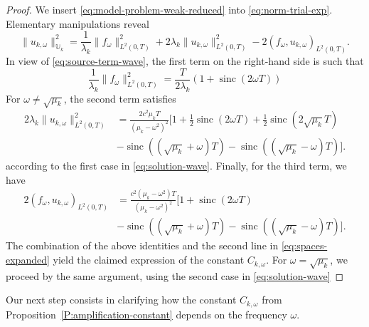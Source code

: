 \documentclass{amsart}
\theoremstyle{plain}
\theoremstyle{remark}
\numberwithin{equation}{section}
\numberwithin{theorem}{section}
\newcommand{\trial}{\mathbb{U}}
\newcommand{\sinc}{\operatorname{sinc}}
\begin{document}
\begin{proof}
We insert \eqref{eq:model-problem-weak-reduced} into \eqref{eq:norm-trial-exp}. Elementary manipulations reveal
\begin{equation*}
\|u_{k,\omega}\|^2_{\trial_k} 
=
\frac{1}{\lambda_k} \|f_\omega\|^2_{L^2(0,T)} + 2\lambda_k \|u_{k,\omega}\|^2_{L^2(0,T)} - 2 (f_\omega, u_{k,\omega})_{L^2(0,T)}. 
\end{equation*}
In view of \eqref{eq:source-term-wave}, the first term on the right-hand side is such that
\begin{equation*}
	\frac{1}{\lambda_k}\|f_\omega\|^2_{L^2(0,T)} = \frac{T}{2\lambda_k}\left(1+\sinc(2\omega T)\right)
\end{equation*}
For $\omega \neq \sqrt{\mu_k}$, the second term satisfies
\begin{align*}
    2\lambda_k\|u_{k,\omega}\|_{L^2(0,T)}^2 & =  \frac{2c^2\mu_kT}{(\mu_k-\omega^2)^2} \Bigg[ 1 + \frac{1}{2}\sinc(2\omega T)+ \frac{1}{2}\sinc(2\sqrt{\mu_k}T) \\ &  -\sinc((\sqrt{\mu_k}+\omega)T) -\sinc((\sqrt{\mu_k}-\omega)T)\Bigg].
\end{align*}
according to the first case in \eqref{eq:solution-wave}. Finally, for the third term, we have
\begin{align*}
    2(f_\omega,u_{k,\omega})_{L^2(0,T)} & = \frac{c^2(\mu_k-\omega^2)T}{(\mu_k-\omega^2)^2} \Bigg[ 1 + \sinc(2\omega T) \\ &  -\sinc((\sqrt{\mu_k}+\omega)T) -\sinc((\sqrt{\mu_k}-\omega)T)\Bigg].
\end{align*}
The combination of the above identities and the second line in \eqref{eq:spaces-expanded} yield the claimed expression of the constant $C_{k,\omega}$. For $\omega = \sqrt{\mu_k}$, we proceed by the same argument, using the second case in \eqref{eq:solution-wave}
\end{proof}

Our next step consists in clarifying how the constant $C_{k, \omega}$ from Proposition~\ref{P:amplification-constant} depends on the frequency $\omega$. 
\end{document}
